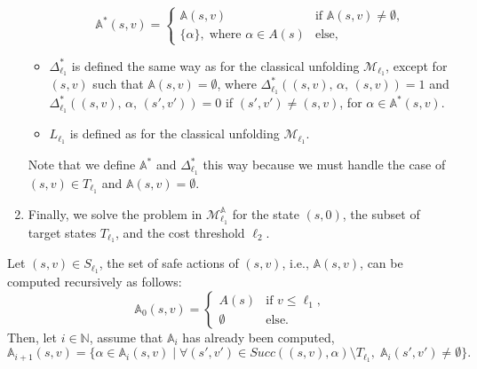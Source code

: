 \begin{algorithm}[H]
\begin{enumerate}
\begin{itemize}
    \[
      \mathbb{A}^*(s, v) = \begin{cases}
        \mathbb{A}(s, v) & \text{if } \mathbb{A}(s, v) \neq \emptyset, \, \\
        \{\alpha\}, \; \text{where } \alpha \in A(s) & \text{else},
      \end{cases}
    \]
    \item $\Delta^*_{\ell_1}$ is defined the same way as for the classical unfolding $\mathcal{M}_{\ell_1}$, except for $(s, v)$ such that $\mathbb{A}(s, v) = \emptyset$, where $\Delta^*_{\ell_1}((s, v),\, \alpha, \, (s, v)) = 1$ and $\Delta^*_{\ell_1}((s, v), \, \alpha, \, (s', v')) = 0$ if $(s', v') \neq (s, v)$, for $\alpha \in \mathbb{A}^*(s, v)$.
    \item $L_{\ell_1}$ is defined as for the classical unfolding $\mathcal{M}_{\ell_1}$.
  \end{itemize}
  Note that we define $\mathbb{A}^*$ and $\Delta_{\ell_1}^*$ this way because we must handle the case of $(s, v) \in T_{\ell_1}$ and $\mathbb{A}(s, v) = \emptyset$.
  \item Finally, we solve the \SSPE{} problem in $\mathcal{M}^\mathbb{A}_{\ell_1}$ for the state $(s, 0)$, the subset of target states $T_{\ell_1}$, and the cost threshold $\ell_2$.
\end{enumerate}
\end{algorithm}
Let $(s, v) \in S_{\ell_1}$, the set of safe actions of $(s, v)$, i.e., $\mathbb{A}(s, v)$, can be computed recursively
as follows:
\begin{equation}
  \mathbb{A}_0(s, v) = \begin{cases}
    A(s) & \text{if }v \leq \ell_1,\\
    \emptyset & \text{else}.
  \end{cases} \label{attractor-set-init}
\end{equation}
Then, let $i \in \mathbb{N}$, assume that $\mathbb{A}_i$ has already been computed,
\begin{equation}
  \mathbb{A}_{i+1}(s, v) = \{ \alpha \in \mathbb{A}_i(s, v) \; | \;
    \forall (s', v') \in Succ( (s, v), \alpha ) \setminus T_{\ell_1}, \; \mathbb{A}_i(s', v') \neq \emptyset \}.
    \label{attractor-set}
\end{equation}
